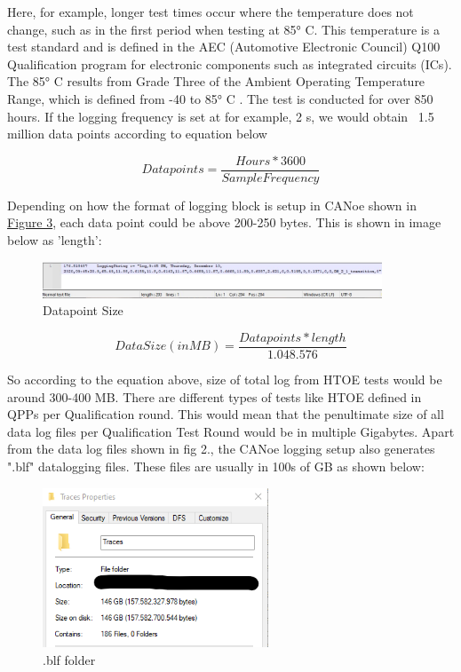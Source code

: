 Here, for example, longer test times occur where the temperature does not change, such as in the first period when testing at 85° C. This temperature is a test standard and is defined in the AEC (Automotive Electronic Council) Q100 Qualification program for electronic components such as integrated circuits (ICs). The 85° C results from Grade Three of the Ambient Operating Temperature Range, which is defined from -40 to 85° C \cite{aec}. The test is conducted for over 850 hours. If the logging frequency is set at for example, 2 s, we would obtain ~1.5 million data points according to equation below 


\begin{equation}
Datapoints = \frac{Hours * 3600}{Sample Frequency}
\end{equation}

Depending on how the format of logging block is setup in CANoe shown in \hyperref[fig:Measurement Setup]{Figure 3}, each data point could be above 200-250 bytes. This is shown in image below as 'length':

\begin{figure}[H]
	\centering
	\includegraphics[width= 0.9\textwidth]{images/Datapoint.jpg}
	\caption{Datapoint Size }  
	\label{fig:Datapoint Size}
\end{figure}
 

\begin{equation}
Data Size (in MB ) = \frac{Datapoints * length}{1.048.576}
\end{equation}

So according to the equation above, size of total log from HTOE tests would be around 300-400 MB. There are different types of tests like HTOE defined in QPPs per Qualification round. This would mean that the penultimate size of all data log files per Qualification Test Round would be in multiple Gigabytes. Apart from the data log files shown in fig 2., the CANoe logging setup also generates ".blf" datalogging files. These files are usually in 100s of GB as shown below:

\begin{figure}[h]
  \centering
  \includegraphics[width= 0.6\textwidth]{images/BLFlocationsize.png}
  \caption{.blf folder}
  \label{fig:Blf File folder}
\end{figure}


